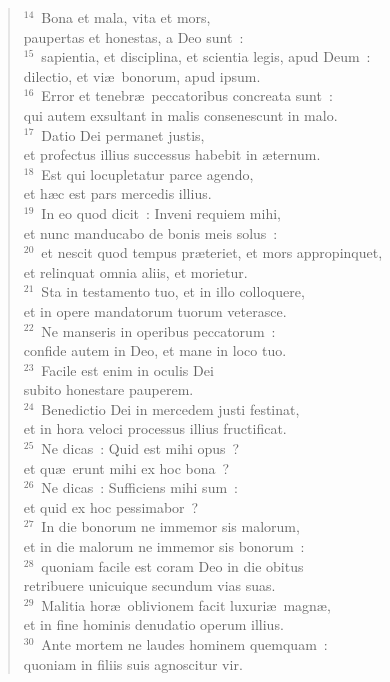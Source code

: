 \begin{flushleft}\begin{verse}${}^{14}$~Bona et mala, vita et mors,\\ paupertas et honestas, a Deo sunt~:\\
${}^{15}$~sapientia, et disciplina, et scientia legis, apud Deum~:\\ dilectio, et vi\ae\ bonorum, apud ipsum.\\
${}^{16}$~Error et tenebr\ae\ peccatoribus concreata sunt~:\\ qui autem exsultant in malis consenescunt in malo.\\
${}^{17}$~Datio Dei permanet justis,\\ et profectus illius successus habebit in \ae ternum.\\
${}^{18}$~Est qui locupletatur parce agendo,\\ et h\ae c est pars mercedis illius.\\
${}^{19}$~In eo quod dicit~: Inveni requiem mihi,\\ et nunc manducabo de bonis meis solus~:\\
${}^{20}$~et nescit quod tempus pr\ae teriet, et mors appropinquet,\\ et relinquat omnia aliis, et morietur.\\
${}^{21}$~Sta in testamento tuo, et in illo colloquere,\\ et in opere mandatorum tuorum veterasce.\\
${}^{22}$~Ne manseris in operibus peccatorum~:\\ confide autem in Deo, et mane in loco tuo.\\
${}^{23}$~Facile est enim in oculis Dei\\ subito honestare pauperem.\\
${}^{24}$~Benedictio Dei in mercedem justi festinat,\\ et in hora veloci processus illius fructificat.\\
${}^{25}$~Ne dicas~: Quid est mihi opus~?\\ et qu\ae\ erunt mihi ex hoc bona~?\\
${}^{26}$~Ne dicas~: Sufficiens mihi sum~:\\ et quid ex hoc pessimabor~?\\
${}^{27}$~In die bonorum ne immemor sis malorum,\\ et in die malorum ne immemor sis bonorum~:\\
${}^{28}$~quoniam facile est coram Deo in die obitus\\ retribuere unicuique secundum vias suas.\\
${}^{29}$~Malitia hor\ae\ oblivionem facit luxuri\ae\ magn\ae ,\\ et in fine hominis denudatio operum illius.\\
${}^{30}$~Ante mortem ne laudes hominem quemquam~:\\ quoniam in filiis suis agnoscitur vir.\end{verse}\end{flushleft}


